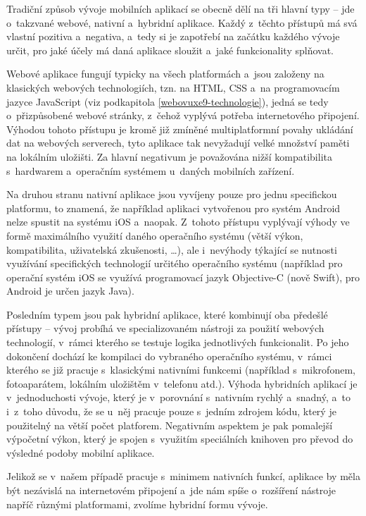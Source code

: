 Tradiční způsob vývoje mobilních aplikací se obecně dělí na tři hlavní
typy -- jde o~takzvané webové, nativní a~hybridní aplikace. Každý
z~těchto přístupů má svá vlastní pozitiva a~negativa, a~tedy si je
zapotřebí na začátku každého vývoje určit, pro jaké účely má daná
aplikace sloužit a~jaké funkcionality splňovat.

Webové aplikace fungují typicky na všech platformách a~jsou založeny na
klasických webových technologiích, tzn. na HTML, CSS a~na programovacím
jazyce JavaScript (viz podkapitola \ref{webovuxe9-technologie}), jedná
se tedy o~přizpůsobené webové stránky, z~čehož vyplývá potřeba
internetového připojení. Výhodou tohoto přístupu je kromě již zmíněné
multiplatformní povahy ukládání dat na webových serverech, tyto aplikace
tak nevyžadují velké množství paměti na lokálním uložišti. Za hlavní
negativum je považována nižší kompatibilita s~hardwarem a~operačním
systémem u~daných mobilních zařízení.

Na druhou stranu nativní aplikace jsou vyvíjeny pouze pro jednu
specifickou platformu, to znamená, že například aplikaci vytvořenou pro
systém Android nelze spustit na systému iOS a~naopak. Z~tohoto přístupu
vyplývají výhody ve formě maximálního využití daného operačního systému
(větší výkon, kompatibilita, uživatelská zkušenosti, \ldots{}), ale
i~nevýhody týkající se nutnosti využívání specifických technologií
určitého operačního systému (například pro operační systém iOS se
využívá programovací jazyk Objective-C (nově Swift), pro Android je
určen jazyk Java).

Posledním typem jsou pak hybridní aplikace, které kombinují oba předešlé
přístupy -- vývoj probíhá ve specializovaném nástroji za použití
webových technologií, v~rámci kterého se testuje logika jednotlivých
funkcionalit. Po jeho dokončení dochází ke kompilaci do vybraného
operačního systému, v~rámci kterého se již pracuje s~klasickými
nativními funkcemi (například s~mikrofonem, fotoaparátem, lokálním
uložištěm v~telefonu atd.). Výhoda hybridních aplikací je
v~jednoduchosti vývoje, který je v~porovnání s~nativním rychlý a~snadný,
a~to i~z~toho důvodu, že se u~něj pracuje pouze s~jedním zdrojem kódu,
který je použitelný na větší počet platforem. Negativním aspektem je pak
pomalejší výpočetní výkon, který je spojen s~využitím speciálních
knihoven pro převod do výsledné podoby mobilní aplikace.

Jelikož se v~našem případě pracuje s~minimem nativních funkcí, aplikace
by měla být nezávislá na internetovém připojení a~jde nám spíše
o~rozšíření nástroje napříč různými platformami, zvolíme hybridní formu
vývoje.


